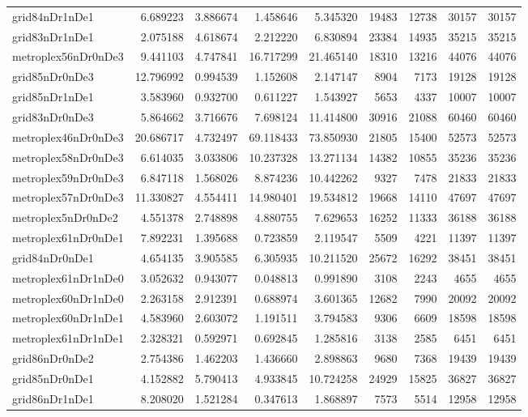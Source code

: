 \begin{longtable}{|l|r|r|r|r|r|r|r|r|}
grid84nDr1nDe1 & 6.689223 & 3.886674 & 1.458646 & 5.345320 & 19483 & 12738 & 30157 & 30157 \\
grid83nDr1nDe1 & 2.075188 & 4.618674 & 2.212220 & 6.830894 & 23384 & 14935 & 35215 & 35215 \\
metroplex56nDr0nDe3 & 9.441103 & 4.747841 & 16.717299 & 21.465140 & 18310 & 13216 & 44076 & 44076 \\
grid85nDr0nDe3 & 12.796992 & 0.994539 & 1.152608 & 2.147147 & 8904 & 7173 & 19128 & 19128 \\
grid85nDr1nDe1 & 3.583960 & 0.932700 & 0.611227 & 1.543927 & 5653 & 4337 & 10007 & 10007 \\
grid83nDr0nDe3 & 5.864662 & 3.716676 & 7.698124 & 11.414800 & 30916 & 21088 & 60460 & 60460 \\
metroplex46nDr0nDe3 & 20.686717 & 4.732497 & 69.118433 & 73.850930 & 21805 & 15400 & 52573 & 52573 \\
metroplex58nDr0nDe3 & 6.614035 & 3.033806 & 10.237328 & 13.271134 & 14382 & 10855 & 35236 & 35236 \\
metroplex59nDr0nDe3 & 6.847118 & 1.568026 & 8.874236 & 10.442262 & 9327 & 7478 & 21833 & 21833 \\
metroplex57nDr0nDe3 & 11.330827 & 4.554411 & 14.980401 & 19.534812 & 19668 & 14110 & 47697 & 47697 \\
metroplex5nDr0nDe2 & 4.551378 & 2.748898 & 4.880755 & 7.629653 & 16252 & 11333 & 36188 & 36188 \\
metroplex61nDr0nDe1 & 7.892231 & 1.395688 & 0.723859 & 2.119547 & 5509 & 4221 & 11397 & 11397 \\
grid84nDr0nDe1 & 4.654135 & 3.905585 & 6.305935 & 10.211520 & 25672 & 16292 & 38451 & 38451 \\
metroplex61nDr1nDe0 & 3.052632 & 0.943077 & 0.048813 & 0.991890 & 3108 & 2243 & 4655 & 4655 \\
metroplex60nDr1nDe0 & 2.263158 & 2.912391 & 0.688974 & 3.601365 & 12682 & 7990 & 20092 & 20092 \\
metroplex60nDr1nDe1 & 4.583960 & 2.603072 & 1.191511 & 3.794583 & 9306 & 6609 & 18598 & 18598 \\
metroplex61nDr1nDe1 & 2.328321 & 0.592971 & 0.692845 & 1.285816 & 3138 & 2585 & 6451 & 6451 \\
grid86nDr0nDe2 & 2.754386 & 1.462203 & 1.436660 & 2.898863 & 9680 & 7368 & 19439 & 19439 \\
grid85nDr0nDe1 & 4.152882 & 5.790413 & 4.933845 & 10.724258 & 24929 & 15825 & 36827 & 36827 \\
grid86nDr1nDe1 & 8.208020 & 1.521284 & 0.347613 & 1.868897 & 7573 & 5514 & 12958 & 12958 \\

\end{longtable}
